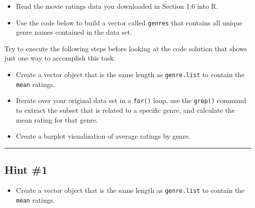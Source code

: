 \documentclass[]{book}
\newenvironment{Shaded}{\begin{snugshade}}{\end{snugshade}}
\newcommand{\KeywordTok}[1]{\textcolor[rgb]{0.13,0.29,0.53}{\textbf{{#1}}}}
\newcommand{\DataTypeTok}[1]{\textcolor[rgb]{0.13,0.29,0.53}{{#1}}}
\newcommand{\CharTok}[1]{\textcolor[rgb]{0.31,0.60,0.02}{{#1}}}
\newcommand{\StringTok}[1]{\textcolor[rgb]{0.31,0.60,0.02}{{#1}}}
\newcommand{\OtherTok}[1]{\textcolor[rgb]{0.56,0.35,0.01}{{#1}}}
\newcommand{\NormalTok}[1]{{#1}}
\providecommand{\tightlist}{%
  \setlength{\itemsep}{0pt}\setlength{\parskip}{0pt}}
\begin{document}
\begin{itemize}
\tightlist
\item
  Read the movie ratings data you downloaded in Section 1.6 into R.
\item
  Use the code below to build a vector called \texttt{genres} that
  contains all unique genre names contained in the data set.
\end{itemize}

\begin{Shaded}
\end{Shaded}

Try to execute the following steps before looking at the code solution
that shows just one way to accomplish this task.

\begin{itemize}
\tightlist
\item
  Create a vector object that is the same length as \texttt{genre.list}
  to contain the \texttt{mean} ratings.
\item
  Iterate over your original data set in a \texttt{for()} loop, use the
  \texttt{grep()} command to extract the subset that is related to a
  specific genre, and calculate the mean rating for that genre.
\item
  Create a barplot visualization of average ratings by genre.
\end{itemize}

\begin{center}\rule{0.5\linewidth}{\linethickness}\end{center}

\subsection{Hint \#1}\label{hint-1-1}

\begin{itemize}
\tightlist
\item
  Create a vector object that is the same length as \texttt{genre.list}
  to contain the \texttt{mean} ratings.
\end{itemize}
\end{document}

